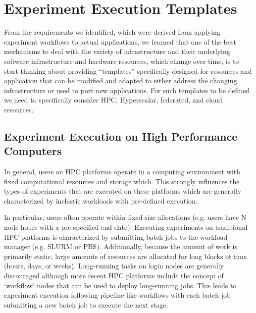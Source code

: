 \documentclass[utf8]{FrontiersinVancouver} %
\begin{document}
\section{Experiment Execution Templates}
\label{sec:templates}

From the requirements we identified, which were derived from applying experiment workflows to actual applications, we learned that one of the best mechanisms to deal with the variety of infrastructure and their underlying software infrastructure and hardware resources, which change over time, is to start thinking about providing ``templates'' specifically designed for resources and application that can be modified and adapted to either address the changing infrastructure or used to port new applications. For such templates to be defined we need to specifically consider HPC, Hyperscalar, federated, and cloud resources.

\subsection{Experiment Execution on High Performance Computers}

In general, users on HPC platforms operate in a computing environment with fixed computational resources and storage which. This strongly influences the types of experiments that are executed on these platforms which are generally characterized by inelastic workloads with pre-defined execution.

In particular, users often operate within fixed size allocations (e.g. users have N node-hours with a pre-specified end date). Executing experiments on traditional HPC platforms is characterized by submitting batch jobs to the workload manager (e.g. SLURM or PBS). Additionally, because the amount of work is primarily static, large amounts of resources are allocated for long blocks of time (hours, days, or weeks). Long-running tasks on login nodes are generally discouraged although more recent HPC platforms include the concept of `workflow' nodes that can be used to deploy long-running jobs. This leads to experiment execution following pipeline-like workflows with each batch job submitting a new batch job to execute the next stage.
\end{document}

